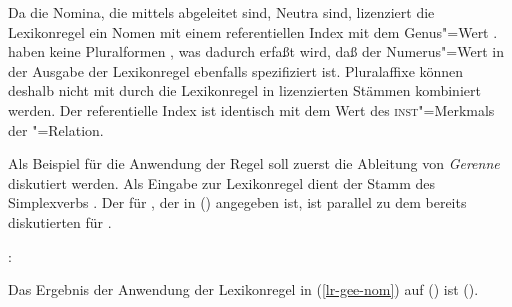 \begin{comment}

The rule applies to all verbs. The valence properties of the nominalized verb
are ignored since this lexical rule licenses only the bare noun with a determiner
without any complements that could be inherited from the verb. Following 
\citet[Chapter~1]{ps2}\ia{Pollard}\ia{Sag} and \citet{Demske2001a}, I assume that the noun selects a determiner,
\ie, I assume an NP analysis rather than a DP\is{determiner phrase}
analysis, but the rule in (\mex{0}) could be easily changed. For a DP
analysis in HPSG see \citew{Abb94}\ia{Abb}. A special variant of a DP analysis
can be found in \citew{Netter94}\ia{Netter} and \citew{Netter98-Eng}.
\end{comment}

Da die Nomina, die mittels \geen abgeleitet sind, Neutra sind, lizenziert
die Lexikonregel ein Nomen mit einem referentiellen Index mit dem Genus"=Wert .
\geenen haben keine Pluralformen \citep[]{Bierwisch89a}, was dadurch
erfaßt wird, daß der Numerus"=Wert in der Ausgabe der Lexikonregel ebenfalls
spezifiziert ist. Pluralaffixe können deshalb nicht mit durch die Lexikonregel
in   lizenzierten Stämmen kombiniert werden. 
Der referentielle Index  ist identisch mit dem Wert des \textsc{inst}"=Merkmals
der "=Relation.



Als Beispiel für die Anwendung der Regel soll zuerst die Ableitung von \emph{Gerenne} diskutiert
werden. Als Eingabe zur Lexikonregel dient der Stamm des Simplexverbs .
Der \locw für , der in () angegeben ist, ist parallel
zu dem bereits diskutierten für .

\eas
{}:\\
\zs

\noindent
Das Ergebnis der Anwendung der Lexikonregel in (\ref{lr-gee-nom}) auf ()
ist ().


